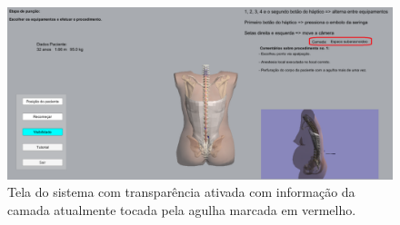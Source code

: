 \begin{figure}[ht!]
    \centering
    \includegraphics[width=\textwidth]{capitulos/figuras/sistemaExecucaoCamadaAtual.png} 
    \caption{Tela do sistema com transparência ativada com informação da camada atualmente tocada pela agulha marcada em vermelho.}
    \label{fig:sistemaExecucaoVisibilidadeCamadaAtual}
\end{figure}